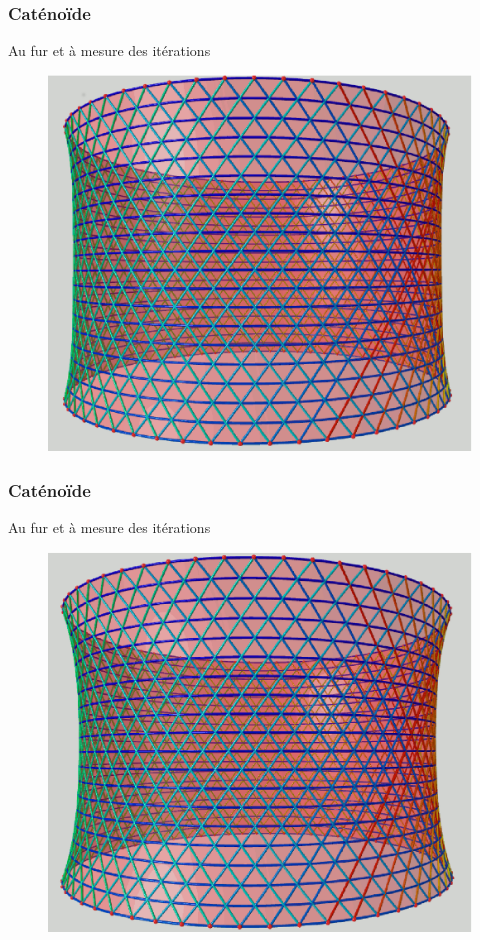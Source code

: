 \documentclass{beamer}
\begin{document}
\begin{frame}
\frametitle{Caténoïde}
Au fur et à mesure des itérations
\begin{figure}[h!]
      \centering 
      \includegraphics[scale=0.31]{catenoide/catenoide-1.eps}
\end{figure}
\end{frame}

\begin{frame}
\frametitle{Caténoïde}
Au fur et à mesure des itérations
\begin{figure}[h!]
      \centering 
      \includegraphics[scale=0.31]{catenoide/catenoide-2.eps}
\end{figure}
\end{frame}
\end{document}
